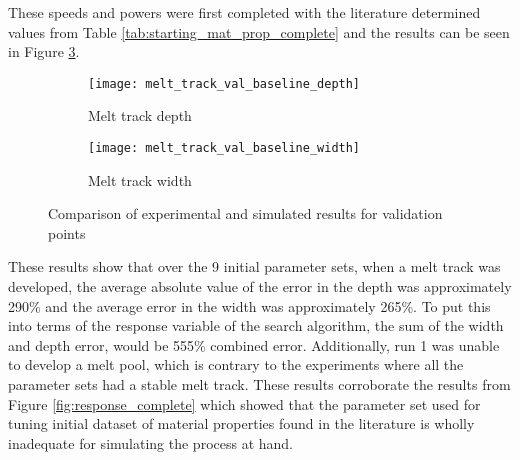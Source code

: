 These speeds and powers were first completed with the literature determined values from Table \ref{tab:starting_mat_prop_complete} and the results can be seen in Figure \ref{fig:melt_track_val_baseline}.
\begin{figure}[!htb]\centering
	\begin{subfigure}[c]{0.45\textwidth}\centering
	\texttt{[image: melt\_track\_val\_baseline\_depth]}
	\caption{Melt track depth}
	\label{fig:melt_track_val_baseline_depth}
	\end{subfigure}\hfill{}
		\begin{subfigure}[c]{0.45\textwidth}\centering
		\texttt{[image: melt\_track\_val\_baseline\_width]}
		\caption{Melt track width}
		\label{fig:melt_track_val_baseline_width}
		\end{subfigure}
	\caption{Comparison of experimental and simulated results for validation points}
	\label{fig:melt_track_val_baseline}
\end{figure}
These results show that over the 9 initial parameter sets, when a melt track was developed, the average absolute value of the error in the depth was approximately 290\% and the average error in the width was approximately 265\%.  To put this into terms of the response variable of the search algorithm, the sum of the width and depth error, would be 555\% combined error.
Additionally, run 1 was unable to develop a melt pool, which is contrary to the experiments where all the parameter sets had a stable melt track.  These results corroborate the results from Figure \ref{fig:response_complete} which showed that the parameter set used for tuning initial dataset of material properties found in the literature is wholly inadequate for simulating the process at hand. 

